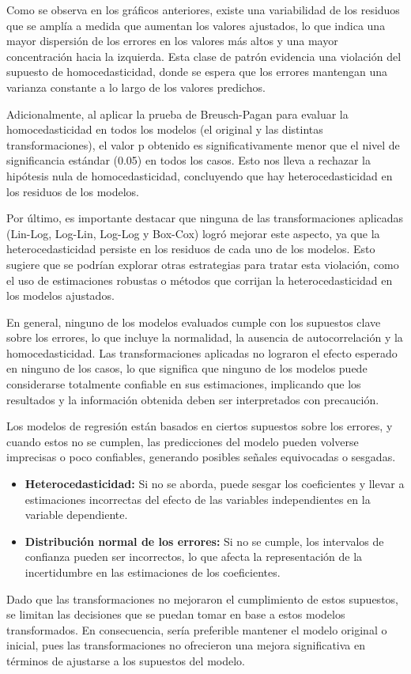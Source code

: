 \documentclass[
]{article}
\providecommand{\tightlist}{%
  \setlength{\itemsep}{0pt}\setlength{\parskip}{0pt}}
\begin{document}
Como se observa en los gráficos anteriores, existe una variabilidad de
los residuos que se amplía a medida que aumentan los valores ajustados,
lo que indica una mayor dispersión de los errores en los valores más
altos y una mayor concentración hacia la izquierda. Esta clase de patrón
evidencia una violación del supuesto de homocedasticidad, donde se
espera que los errores mantengan una varianza constante a lo largo de
los valores predichos.

Adicionalmente, al aplicar la prueba de Breusch-Pagan para evaluar la
homocedasticidad en todos los modelos (el original y las distintas
transformaciones), el valor p obtenido es significativamente menor que
el nivel de significancia estándar (0.05) en todos los casos. Esto nos
lleva a rechazar la hipótesis nula de homocedasticidad, concluyendo que
hay heterocedasticidad en los residuos de los modelos.

Por último, es importante destacar que ninguna de las transformaciones
aplicadas (Lin-Log, Log-Lin, Log-Log y Box-Cox) logró mejorar este
aspecto, ya que la heterocedasticidad persiste en los residuos de cada
uno de los modelos. Esto sugiere que se podrían explorar otras
estrategias para tratar esta violación, como el uso de estimaciones
robustas o métodos que corrijan la heterocedasticidad en los modelos
ajustados.

En general, ninguno de los modelos evaluados cumple con los supuestos
clave sobre los errores, lo que incluye la normalidad, la ausencia de
autocorrelación y la homocedasticidad. Las transformaciones aplicadas no
lograron el efecto esperado en ninguno de los casos, lo que significa
que ninguno de los modelos puede considerarse totalmente confiable en
sus estimaciones, implicando que los resultados y la información
obtenida deben ser interpretados con precaución.

Los modelos de regresión están basados en ciertos supuestos sobre los
errores, y cuando estos no se cumplen, las predicciones del modelo
pueden volverse imprecisas o poco confiables, generando posibles señales
equivocadas o sesgadas.

\begin{itemize}
\tightlist
\item
  \textbf{Heterocedasticidad:} Si no se aborda, puede sesgar los
  coeficientes y llevar a estimaciones incorrectas del efecto de las
  variables independientes en la variable dependiente.
\item
  \textbf{Distribución normal de los errores:} Si no se cumple, los
  intervalos de confianza pueden ser incorrectos, lo que afecta la
  representación de la incertidumbre en las estimaciones de los
  coeficientes.
\end{itemize}

Dado que las transformaciones no mejoraron el cumplimiento de estos
supuestos, se limitan las decisiones que se puedan tomar en base a estos
modelos transformados. En consecuencia, sería preferible mantener el
modelo original o inicial, pues las transformaciones no ofrecieron una
mejora significativa en términos de ajustarse a los supuestos del
modelo.
\end{document}
